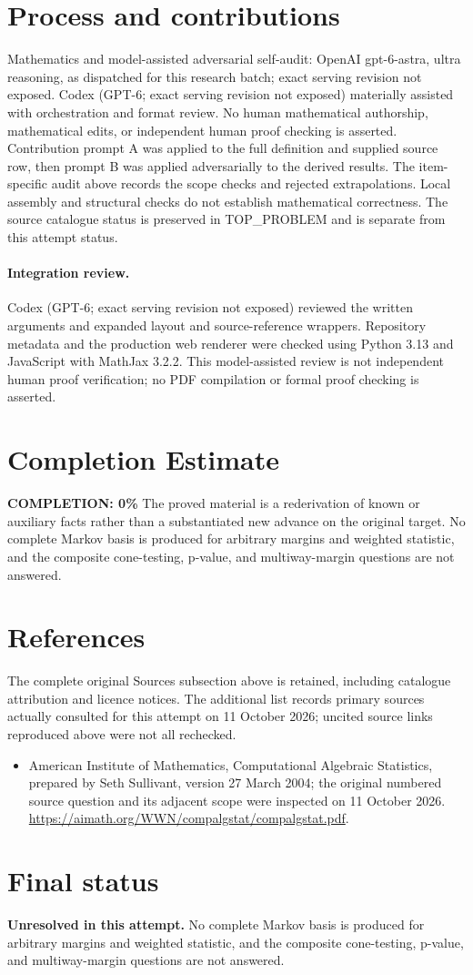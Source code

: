 \documentclass[11pt]{article}
\begin{document}
\section{Process and contributions}
Mathematics and model-assisted adversarial self-audit: OpenAI gpt-6-astra, ultra reasoning, as dispatched for this research batch; exact serving revision not exposed. Codex (GPT-6; exact serving revision not exposed) materially assisted with orchestration and format review. No human mathematical authorship, mathematical edits, or independent human proof checking is asserted.
Contribution prompt A was applied to the full definition and supplied source row, then prompt B was applied adversarially to the derived results. The item-specific audit above records the scope checks and rejected extrapolations. Local assembly and structural checks do not establish mathematical correctness. The source catalogue status is preserved in TOP\_PROBLEM and is separate from this attempt status.
\paragraph{Integration review.} Codex (GPT-6; exact serving revision not exposed) reviewed the written arguments and expanded layout and source-reference wrappers. Repository metadata and the production web renderer were checked using Python 3.13 and JavaScript with MathJax 3.2.2. This model-assisted review is not independent human proof verification; no PDF compilation or formal proof checking is asserted.

\section{Completion Estimate}
\noindent\textbf{COMPLETION: 0\%}
The proved material is a rederivation of known or auxiliary facts rather than a substantiated new advance on the original target. No complete Markov basis is produced for arbitrary margins and weighted statistic, and the composite cone-testing, p-value, and multiway-margin questions are not answered.
\section{References}
The complete original Sources subsection above is retained, including catalogue attribution and licence notices. The additional list records primary sources actually consulted for this attempt on 11 October 2026; uncited source links reproduced above were not all rechecked.
\begin{itemize}
\item American Institute of Mathematics, Computational Algebraic Statistics, prepared by Seth Sullivant, version 27 March 2004; the original numbered source question and its adjacent scope were inspected on 11 October 2026. \url{https://aimath.org/WWN/compalgstat/compalgstat.pdf}.
\end{itemize}
\section{Final status}
\textbf{Unresolved in this attempt.} No complete Markov basis is produced for arbitrary margins and weighted statistic, and the composite cone-testing, p-value, and multiway-margin questions are not answered.
\end{document}
